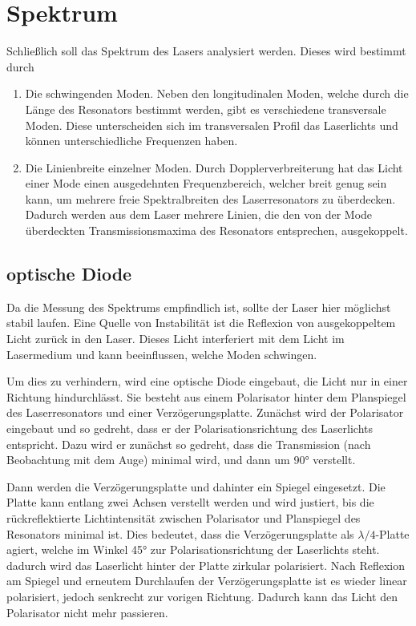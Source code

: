 \documentclass{article}
\newcommand{\defc}{black}
\newcommand{\colorT}[2][blue]{\color{#1}{#2}\color{\defc}}
\newcommand{\todo}[1]{\colorT[red]{\textbf{(#1)}}}
\begin{document}
\section{Spektrum}
Schließlich soll das Spektrum des Lasers analysiert werden. Dieses wird bestimmt durch
\begin{enumerate}
  \item Die schwingenden Moden. Neben den longitudinalen Moden, welche durch die Länge des Resonators bestimmt werden,
    gibt es verschiedene transversale Moden. Diese unterscheiden sich im transversalen Profil das Laserlichts und
    können unterschiedliche Frequenzen haben.
  \item Die Linienbreite einzelner Moden. Durch Dopplerverbreiterung hat das Licht einer Mode
    einen ausgedehnten Frequenzbereich, welcher breit genug sein kann, um mehrere freie Spektralbreiten des
    Laserresonators zu überdecken. Dadurch werden aus dem Laser mehrere Linien, die den von der Mode
    überdeckten Transmissionsmaxima des Resonators entsprechen, ausgekoppelt.
\end{enumerate}
\todo{stimmt das? FSR erklären}

\subsection{optische Diode}
Da die Messung des Spektrums empfindlich ist, sollte der Laser hier möglichst stabil laufen.
Eine Quelle von Instabilität ist die Reflexion von ausgekoppeltem Licht zurück in den Laser. 
Dieses Licht interferiert mit dem Licht im Lasermedium und kann beeinflussen, welche Moden schwingen.

Um dies zu verhindern, wird eine optische Diode eingebaut, die Licht nur in einer Richtung hindurchlässt.
Sie besteht aus einem Polarisator hinter dem Planspiegel des Laserresonators und einer Verzögerungsplatte.
Zunächst wird der Polarisator eingebaut und so gedreht, dass er der Polarisationsrichtung des Laserlichts entspricht.
Dazu wird er zunächst so gedreht, dass die Transmission (nach Beobachtung mit dem Auge) minimal wird,
und dann um \ang{90} verstellt.

Dann werden die Verzögerungsplatte und dahinter ein Spiegel eingesetzt.
Die Platte kann entlang zwei Achsen verstellt werden und wird justiert, bis die rückreflektierte
Lichtintensität zwischen Polarisator und Planspiegel des Resonators minimal ist. Dies bedeutet,
dass die Verzögerungsplatte als $\lambda/4$-Platte agiert, welche im Winkel \ang{45} zur Polarisationsrichtung
der Laserlichts steht. dadurch wird das Laserlicht hinter der Platte zirkular polarisiert. Nach Reflexion
am Spiegel und erneutem Durchlaufen der Verzögerungsplatte ist es wieder linear polarisiert,
jedoch senkrecht zur vorigen Richtung. Dadurch kann das Licht den Polarisator nicht mehr passieren.
\end{document}
